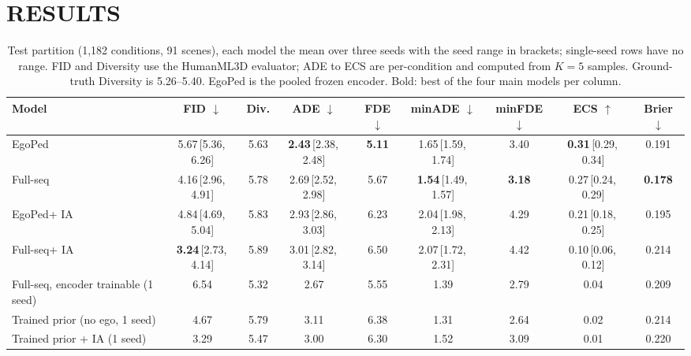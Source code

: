 \documentclass{ieeeoj}
\newcommand{\method}{EgoPed\xspace}
\newcommand{\fullseq}{Full-seq\xspace}
\newcommand{\ci}[2]{\,{\scriptsize[#1,\,#2]}}
\begin{document}
\section{RESULTS}
\label{sec:results}

\begin{table}[t]
  \centering
  \caption{Test partition (1{,}182 conditions, 91 scenes), each model the mean over three seeds with the seed range in brackets; single-seed rows have no range. FID and Diversity use the HumanML3D evaluator; ADE to ECS are per-condition and computed from $K{=}5$ samples. Ground-truth Diversity is 5.26--5.40. \method is the pooled frozen encoder. Bold: best of the four main models per column.}
  \label{tab:main}
  \vspace{4pt}
  \small
  \setlength{\tabcolsep}{3pt}
  \begin{tabular}{lcc|cccccc}
    \toprule
    Model & FID $\downarrow$ & Div. & ADE $\downarrow$ & FDE $\downarrow$ & minADE $\downarrow$ & minFDE $\downarrow$ & ECS $\uparrow$ & Brier $\downarrow$ \\
    \midrule
    \method & 5.67\ci{5.36}{6.26} & 5.63 & \textbf{2.43}\ci{2.38}{2.48} & \textbf{5.11} & 1.65\ci{1.59}{1.74} & 3.40 & \textbf{0.31}\ci{0.29}{0.34} & 0.191 \\
    \fullseq & 4.16\ci{2.96}{4.91} & 5.78 & 2.69\ci{2.52}{2.98} & 5.67 & \textbf{1.54}\ci{1.49}{1.57} & \textbf{3.18} & 0.27\ci{0.24}{0.29} & \textbf{0.178} \\
    \method + IA & 4.84\ci{4.69}{5.04} & 5.83 & 2.93\ci{2.86}{3.03} & 6.23 & 2.04\ci{1.98}{2.13} & 4.29 & 0.21\ci{0.18}{0.25} & 0.195 \\
    \fullseq + IA & \textbf{3.24}\ci{2.73}{4.14} & 5.89 & 3.01\ci{2.82}{3.14} & 6.50 & 2.07\ci{1.72}{2.31} & 4.42 & 0.10\ci{0.06}{0.12} & 0.214 \\
    \fullseq, encoder trainable (1 seed) & 6.54 & 5.32 & 2.67 & 5.55 & 1.39 & 2.79 & 0.04 & 0.209 \\
    \midrule
    Trained prior (no ego, 1 seed) & 4.67 & 5.79 & 3.11 & 6.38 & 1.31 & 2.64 & 0.02 & 0.214 \\
    Trained prior + IA (1 seed) & 3.29 & 5.47 & 3.00 & 6.30 & 1.52 & 3.09 & 0.01 & 0.220 \\
    \bottomrule
  \end{tabular}
\end{table}
\end{document}
